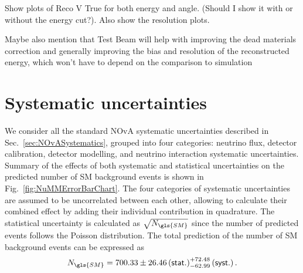 Show plots of Reco V True for both energy and angle. (Should I show it with or without the energy cut?). Also show the resolution plots.

Maybe also mention that Test Beam will help with improving the dead materials correction and generally improving the bias and resolution of the reconstructed energy, which won't have to depend on the comparison to simulation
\fi
\section{Systematic uncertainties}\label{sec:NuMMSystematics}

We consider all the standard \gls{NOvA} systematic uncertainties described in Sec.~\ref{sec:NOvASystematics}, grouped into four categories: neutrino flux, detector calibration, detector modelling, and neutrino interaction systematic uncertainties. Summary of the effects of both systematic and statistical uncertainties on the predicted number of \gls{SM} background events is shown in Fig.~\ref{fig:NuMMErrorBarChart}. The four categories of systematic uncertainties are assumed to be uncorrelated between each other, allowing to calculate their combined effect by adding their individual contribution in quadrature. The statistical uncertainty is calculated as $\sqrt{N_{\gls{SM}}}$ since the number of predicted events follows the Poisson distribution. The total prediction of the number of \gls{SM} background events can be expressed as
\begin{equation}\label{eq:NumberOfSMEventsWithSysts}
N_{\gls{SM}}=700.33 \pm 26.46\left(\textsf{stat.}\right) ^{+72.48}_{-62.99}\left(\textsf{syst.}\right).
\end{equation}

